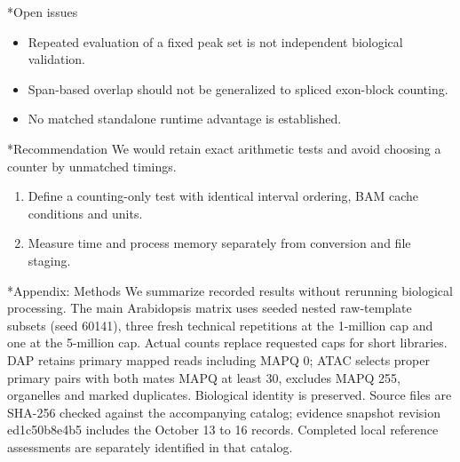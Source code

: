 \documentclass[10pt,letterpaper]{article}
\makeatletter
\renewcommand\section{\@startsection{section}{1}{\z@}{9pt}{4pt}{\large\bfseries}}
\makeatother
\begin{document}
\section*{Open issues}
\begin{itemize}
\item Repeated evaluation of a fixed peak set is not independent biological validation.
\item Span-based overlap should not be generalized to spliced exon-block counting.
\item No matched standalone runtime advantage is established.
\end{itemize}
\section*{Recommendation}
We would retain exact arithmetic tests and avoid choosing a counter by unmatched timings.

\begin{enumerate}
\item Define a counting-only test with identical interval ordering, BAM cache conditions and units.
\item Measure time and process memory separately from conversion and file staging.
\end{enumerate}
\section*{Appendix: Methods}
We summarize recorded results without rerunning biological processing. The main Arabidopsis matrix uses seeded nested raw-template subsets (seed 60141), three fresh technical repetitions at the 1-million cap and one at the 5-million cap. Actual counts replace requested caps for short libraries. DAP retains primary mapped reads including MAPQ 0; ATAC selects proper primary pairs with both mates MAPQ at least 30, excludes MAPQ 255, organelles and marked duplicates. Biological identity is preserved. Source files are SHA-256 checked against the accompanying catalog; evidence snapshot revision ed1c50b8e4b5 includes the October 13 to 16 records. Completed local reference assessments are separately identified in that catalog.
\end{document}
